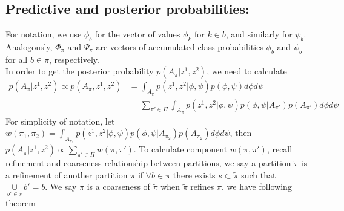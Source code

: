 \documentclass[11pt]{amsart}
\begin{document}
\subsection{Predictive and posterior probabilities:}
For notation, we use $\phi_b$ for the vector of values $\phi_k$ for $k \in b$,
and similarly for $\psi_b$. Analogously, $\Phi_\pi$ and $\Psi_\pi$
 are vectors of 
accumulated class probabilities $\phi_b$ and $\psi_b$ for all $b \in \pi$,
 respectively. \\
In order to get the posterior probability $p(A_\pi | z^1,z^2)$, we need to calculate 
\[
\begin{split}
p(A_\pi | z^1,z^2)\propto p(A_\pi, z^1,z^2) &= \int_{A_\pi} p(z^1,z^2|\phi,\psi)p(\phi,\psi) d\phi d\psi\\ 
&= \sum_{\pi'\in \Pi}\int_{A_\pi} p(z^1,z^2|\phi,\psi)p(\phi, \psi | A_{\pi'})p(A_{\pi'})d\phi d\psi
\end{split}
\]
For simplicity of notation, let $w(\pi_1, \pi_2) = \int_{A_{\pi_1}} p(z^1,z^2|\phi,\psi)p(\phi, \psi | A_{\pi_2})p(A_{\pi_2})d\phi d\psi$, then 
$p(A_\pi | z^1,z^2)\propto \underset{\pi'\in \Pi}\sum w(\pi, \pi')$. To calculate component $w(\pi, \pi')$, recall refinement and coarseness relationship between partitions, we say a partition $\tilde{\pi}$ is a refinement of another partition $\pi$ if $\forall b \in \pi$ there exists $s \subset \tilde{\pi}$  such that $\underset{b'\in s}\cup b' = b$. We say $\pi$ is a coarseness of $\tilde{\pi}$ when $\tilde{\pi}$ refines $\pi$. we have following theorem
\end{document}
